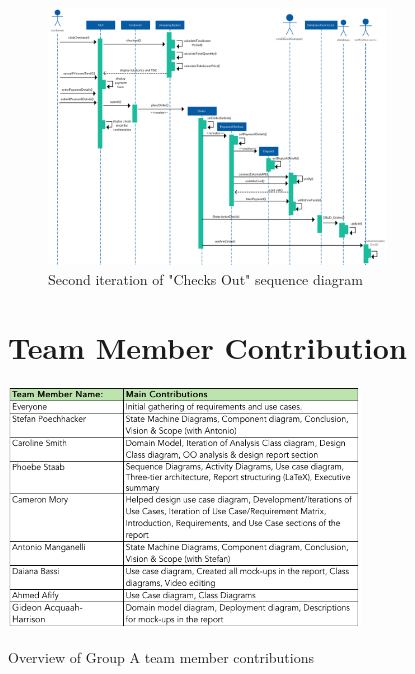 \begin{figure}[H]
      \centering
      \includegraphics[trim = 0 0 0 0, clip, width=0.8\textwidth]{TempImg/SD1_2.png}
      \caption{Second iteration of "Checks Out" sequence diagram}
\end{figure}

\newpage
\section{Team Member Contribution}

\begin{table}[H]
      \centering
      \includegraphics[trim = 0 0 0 0, clip, width=0.7\textwidth]{TempImg/TC.png}
      \caption{Overview of Group A team member contributions}
\end{table}




